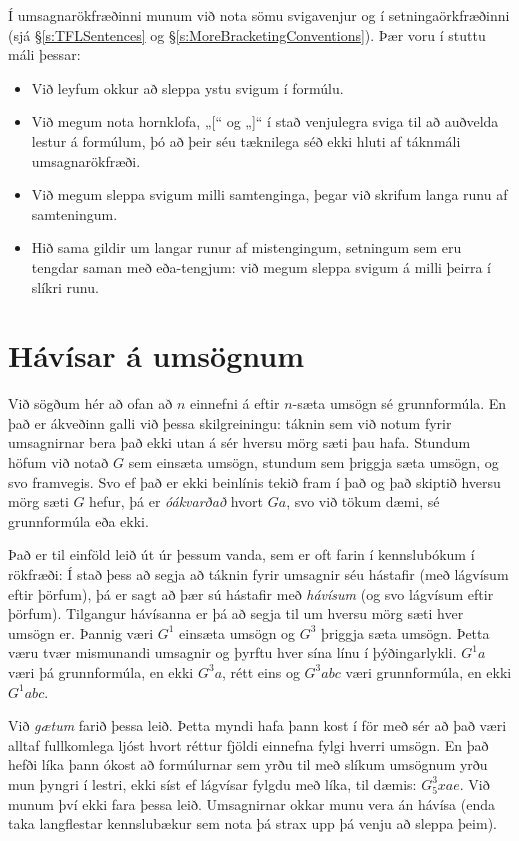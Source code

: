 Í umsagnarökfræðinni munum við nota sömu svigavenjur og í setningaörkfræðinni (sjá \S\ref{s:TFLSentences} og \S\ref{s:MoreBracketingConventions}). Þær voru í stuttu máli þessar:

\begin{itemize}
	\item Við leyfum okkur að sleppa ystu svigum í formúlu.
	\item Við megum nota hornklofa, „[“ og „]“ í stað venjulegra sviga til að auðvelda lestur á formúlum, þó að þeir séu tæknilega séð ekki hluti af táknmáli umsagnarökfræði.
	\item Við megum sleppa svigum milli samtenginga, þegar við skrifum langa runu af samteningum.
	\item Hið sama gildir um langar runur af mistengingum, setningum sem eru tengdar saman með eða-tengjum: við megum sleppa svigum á milli þeirra í slíkri runu.
\end{itemize}


\section{Hávísar á umsögnum}

Við sögðum hér að ofan að $n$ einnefni á eftir $n$-sæta umsögn sé grunnformúla. En það er ákveðinn galli við þessa skilgreiningu: táknin sem við notum fyrir umsagnirnar bera það ekki utan á sér hversu mörg sæti þau hafa. Stundum höfum við notað $G$ sem einsæta umsögn, stundum sem þriggja sæta umsögn, og svo framvegis. Svo ef það er ekki beinlínis tekið fram í það og það skiptið hversu mörg sæti $G$ hefur, þá er \emph{óákvarðað} hvort $Ga$, svo við tökum dæmi, sé grunnformúla eða ekki.

Það er til einföld leið út úr þessum vanda, sem er oft farin í kennslubókum í rökfræði: Í stað þess að segja að táknin fyrir umsagnir séu hástafir (með lágvísum eftir þörfum), þá er sagt að þær sú hástafir með \emph{hávísum} (og svo lágvísum eftir þörfum). Tilgangur hávísanna er þá að segja til um hversu mörg sæti hver umsögn er. Þannig væri $G^1$ einsæta umsögn og $G^3$ þriggja sæta umsögn. Þetta væru tvær mismunandi umsagnir og þyrftu hver sína línu í þýðingarlykli. $G^1a$ væri þá grunnformúla, en ekki $G^3a$, rétt eins og $G^3abc$ væri grunnformúla, en ekki $G^1abc$.

Við \emph{gætum} farið þessa leið. Þetta myndi hafa þann kost í för með sér að það væri alltaf fullkomlega ljóst hvort réttur fjöldi einnefna fylgi hverri umsögn. En það hefði líka þann ókost að formúlurnar sem yrðu til með slíkum umsögnum yrðu mun þyngri í lestri, ekki síst ef lágvísar fylgdu með líka, til dæmis: $G^3_5xae$. Við munum því ekki fara þessa leið. Umsagnirnar okkar munu vera án hávísa (enda taka langflestar kennslubækur sem nota þá strax upp þá venju að sleppa þeim). 

